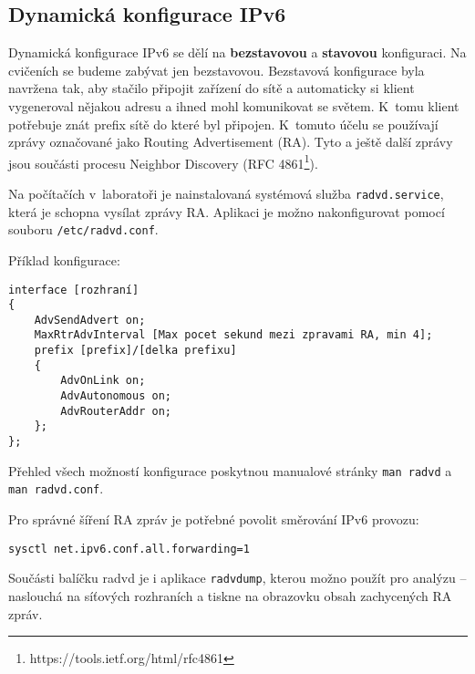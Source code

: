 \subsection{Dynamická konfigurace IPv6}\label{dyn-ipv6}
Dynamická konfigurace IPv6 se dělí na {\bf bezstavovou} a {\bf stavovou}
konfiguraci. Na cvičeních se budeme zabývat jen bezstavovou. Bezstavová
konfigurace byla navržena tak, aby stačilo připojit zařízení do sítě a
automaticky si klient vygeneroval nějakou adresu a ihned mohl komunikovat se
světem. K~tomu klient potřebuje znát prefix sítě do které byl připojen.
K~tomuto účelu se používají zprávy označované jako Routing Advertisement (RA).
Tyto a ještě další zprávy jsou součásti procesu Neighbor Discovery (RFC
4861\footnote{https://tools.ietf.org/html/rfc4861}).

Na počítačích v~laboratoři je nainstalovaná systémová služba {\tt radvd.service},
která je schopna vysílat zprávy RA. Aplikaci je možno nakonfigurovat pomocí
souboru {\tt /etc/radvd.conf}.

Příklad konfigurace:
\begin{verbatim}
interface [rozhraní]
{
    AdvSendAdvert on;
    MaxRtrAdvInterval [Max pocet sekund mezi zpravami RA, min 4];
    prefix [prefix]/[delka prefixu]
    {
        AdvOnLink on;
        AdvAutonomous on;
        AdvRouterAddr on;
    };
};
\end{verbatim}
Přehled všech možností konfigurace poskytnou manualové stránky {\tt man radvd}
a {\tt man radvd.conf}.

Pro správné šíření RA zpráv je potřebné povolit směrování IPv6 provozu:
\begin{verbatim}
sysctl net.ipv6.conf.all.forwarding=1
\end{verbatim}

Součásti balíčku radvd je i aplikace {\tt radvdump}, kterou možno použít pro
analýzu -- naslouchá na síťových rozhraních a tiskne na obrazovku obsah
zachycených RA zpráv.
